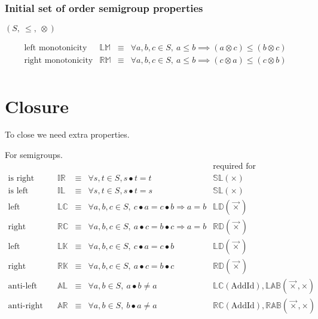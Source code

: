 \documentclass[10pt]{article}
\newcommand{\propname}[1]{{\mathbb{#1}}}
\begin{document}
\subsubsection{Initial set of order semigroup properties}

$(S,\ \leq,\ \otimes)$

\[ 
\begin{array}{c|ccl} 
\mbox{left monotonicity} 
   & \propname{LM} 
   & \equiv 
   & \forall a, b, c \in S,\ a\leq b \implies (a\otimes c) \leq (b\otimes c) 
   \\ 
\mbox{right monotonicity} 
   & \propname{RM} 
   & \equiv 
   & \forall a, b, c \in S,\ a\leq b \implies (c\otimes a) \leq (c\otimes b)
   \\ 
\end{array} 
\] 


\section{Closure} 

To close we need extra properties. 

For semigroups. 
\[ 
\begin{array}{c|ccl|l} 
   & 
   & 
   & 
   & \mbox{required for} 
   \\ \hline 
\mbox{is right}   
   & \propname{IR} 
   & \equiv 
   & \forall s, t\in S, s \bullet t = t 
   & \propname{SL}(\times)
   \\ 
\mbox{is left}   
   & \propname{IL} 
   & \equiv 
   & \forall s, t\in S, s \bullet t = s 
   & \propname{SL}(\times)
   \\ 
\mbox{left cancellative}   
   & \propname{LC}
   & \equiv 
   & \forall a, b, c\in S,\  c \bullet a = c \bullet b \Rightarrow a = b 
   & \propname{LD}(\vec{\times})
   \\ 
\mbox{right cancellative}   
    & \propname{RC}
    & \equiv 
    & \forall a, b, c\in S,\  a \bullet c = b \bullet c \Rightarrow a = b
   & \propname{RD}(\vec{\times})
   \\ 
\mbox{left constant}   
   & \propname{LK}
   & \equiv 
   & \forall a, b, c\in S,\ c \bullet a = c \bullet b 
   & \propname{LD}(\vec{\times})
   \\ 
\mbox{right constant}   
   & \propname{RK}
   & \equiv 
   & \forall a, b, c\in S,\ a \bullet c =  b \bullet c
   & \propname{RD}(\vec{\times})
   \\ 
\mbox{anti-left}   
   & \propname{AL}
   & \equiv 
   & \forall a, b\in S,\ a \bullet b \not= a
   & \propname{LC}(\mathrm{AddId}),  
     \propname{LAB}(\vec{\times}, \times)   
   \\ 
\mbox{anti-right}   
   & \propname{AR}
   & \equiv 
   & \forall a, b\in S,\ b \bullet a \not= a
   & \propname{RC}(\mathrm{AddId}), 
     \propname{RAB}(\vec{\times}, \times)   
   \\ 
\end{array} 
\]
\end{document}
